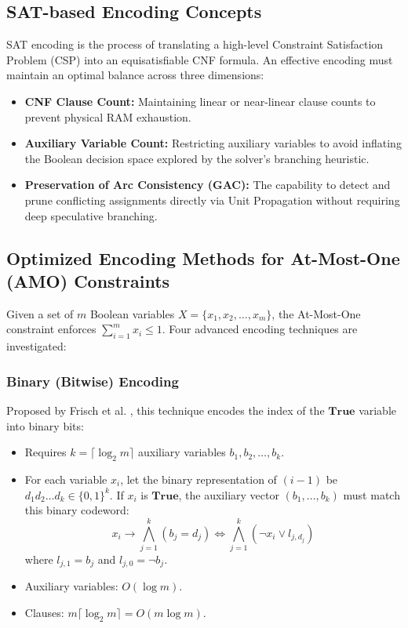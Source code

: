 \documentclass[a4paper,fleqn]{cas-sc}
\begin{document}
\subsection{SAT-based Encoding Concepts}
\label{subsec:sat_encoding_concept}
SAT encoding is the process of translating a high-level Constraint Satisfaction Problem (CSP) into an equisatisfiable CNF formula. An effective encoding must maintain an optimal balance across three dimensions:
\begin{itemize}
    \item \textbf{CNF Clause Count:} Maintaining linear or near-linear clause counts to prevent physical RAM exhaustion.
    \item \textbf{Auxiliary Variable Count:} Restricting auxiliary variables to avoid inflating the Boolean decision space explored by the solver's branching heuristic.
    \item \textbf{Preservation of Arc Consistency (GAC):} The capability to detect and prune conflicting assignments directly via Unit Propagation without requiring deep speculative branching.
\end{itemize}

\subsection{Optimized Encoding Methods for At-Most-One (AMO) Constraints}
\label{subsec:amo_encodings}
Given a set of $m$ Boolean variables $X = \{x_1, x_2, \dots, x_m\}$, the At-Most-One constraint enforces $\sum_{i=1}^m x_i \le 1$. Four advanced encoding techniques are investigated:

\subsubsection{Binary (Bitwise) Encoding}
Proposed by Frisch et al. \cite{frisch2005atmost}, this technique encodes the index of the $\mathbf{True}$ variable into binary bits:
\begin{itemize}
    \item Requires $k = \lceil \log_2 m \rceil$ auxiliary variables $b_1, b_2, \dots, b_k$.
    \item For each variable $x_i$, let the binary representation of $(i-1)$ be $d_1 d_2 \dots d_k \in \{0, 1\}^k$. If $x_i$ is $\mathbf{True}$, the auxiliary vector $(b_1, \dots, b_k)$ must match this binary codeword:
    \begin{equation}
    x_i \to \bigwedge_{j=1}^k (b_j = d_j) \iff \bigwedge_{j=1}^k (\neg x_i \lor l_{j, d_j})
    \end{equation}
    where $l_{j, 1} = b_j$ and $l_{j, 0} = \neg b_j$.
    \item Auxiliary variables: $O(\log m)$.
    \item Clauses: $m \lceil \log_2 m \rceil = O(m \log m)$.
\end{itemize}
\end{document}
